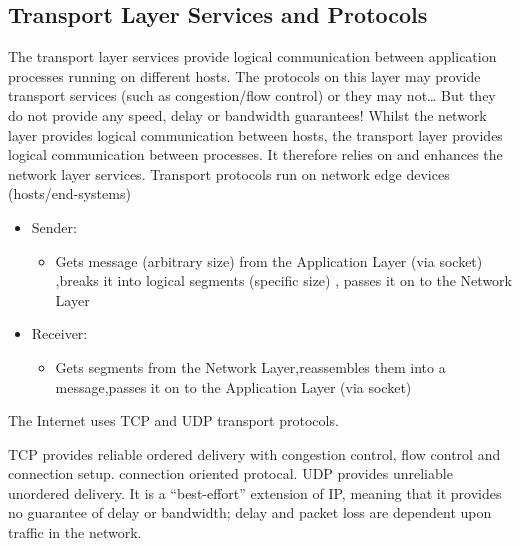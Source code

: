 \subsection{Transport Layer Services and Protocols}

The transport layer services provide logical communication between application processes running on different hosts.
The protocols on this layer may provide transport services (such as congestion/flow control) or they may not…
But they do not provide any speed, delay or bandwidth guarantees!
Whilst the network layer provides logical communication between hosts, the transport layer provides logical communication between processes.
It therefore relies on and enhances the network layer services.
Transport protocols run on network edge devices (hosts/end-systems)
\begin{itemize}
  \item Sender:
    \begin{itemize}
      \item Gets message (arbitrary size) from the Application Layer (via socket) ,breaks it into logical segments (specific size) , passes it on to the Network Layer
    \end{itemize}
  \item Receiver:
    \begin{itemize}
      \item Gets segments from the Network Layer,reassembles them into a message,passes it on to the Application Layer (via socket)
    \end{itemize}
\end{itemize}
The Internet uses TCP and UDP transport protocols.

TCP provides reliable ordered delivery with congestion control, flow control and connection setup. connection oriented protocal.
UDP provides unreliable unordered delivery.
It is a ``best-effort'' extension of IP, meaning that it provides no guarantee of delay or bandwidth; delay and packet loss are dependent upon traffic in the network.

